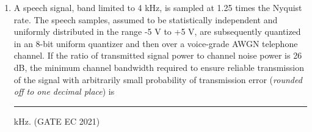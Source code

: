 \begin{enumerate}[label=\thechapter.\arabic*,ref=\thechapter.\theenumi]
\item A speech signal, band limited to 4 kHz, is sampled at 1.25 times the Nyquist rate. The speech samples, assumed to be statistically independent and uniformly distributed in the range -5 V to +5 V, are subsequently quantized in an 8-bit uniform quantizer and then over a voice-grade AWGN telephone channel. If the ratio of transmitted signal power to channel noise power is 26 dB, the minimum channel bandwidth required to ensure reliable transmission of the signal with arbitrarily small probability of transmission error (\textit{rounded off to one decimal place}) is \rule{1cm}{0.15mm} kHz.
\hfill (GATE EC 2021)
\solution

\pagebreak
\end{enumerate}
